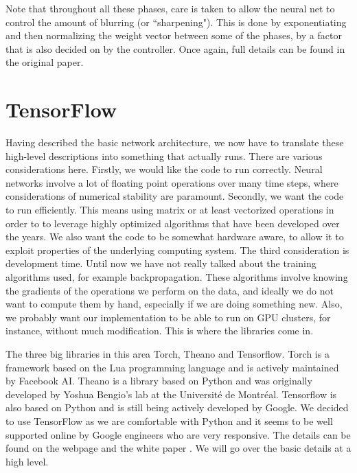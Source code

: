 \documentclass[12pt]{article}
\begin{document}
Note that throughout all these phases, care is taken to allow the neural net
to control the amount of blurring (or ``sharpening").
This is done by exponentiating and then
normalizing the weight vector between some of the phases, by a factor that is also
decided on by the controller. Once again, full details can be found in the original
paper.

\section{TensorFlow}\label{tensorflow}

Having described the basic network architecture, we now have to translate
these high-level descriptions into something that actually runs. There
are various considerations here. Firstly, we would like the code to 
run correctly. Neural networks involve a lot of floating point operations
over many time steps, where considerations of numerical stability
are paramount. Secondly, we want the code to run efficiently.
This means using matrix or at least vectorized operations in order to to
leverage highly optimized algorithms that have been developed over the years.
We also want the code to be somewhat hardware aware, to allow it to
exploit properties of the underlying computing system. The third consideration
is development time. Until now we have not really talked about the training
algorithms used, for example backpropagation. These algorithms involve knowing the
gradients of the operations we perform on the data, and ideally we do not want
to compute them by hand, especially if we are doing something new. Also,
we probably want our implementation to be able to run on GPU clusters, for instance,
without much modification. This is where the libraries come in.

The three big libraries in this area Torch, Theano and Tensorflow. Torch is a framework
based on the Lua programming language and is actively maintained by Facebook AI. Theano
is a library based on Python and was originally developed by Yoshua Bengio's lab
at the Universit\'e de Montr\'eal. Tensorflow is also based on Python and is still
being actively developed by Google. We decided to use TensorFlow as we are comfortable
with Python and it seems to be well supported online by Google engineers
who are very responsive. The details can be found on the webpage and the white paper
\cite{tensorflow2015-whitepaper}. We will go over the basic details at a high level.
\end{document}
